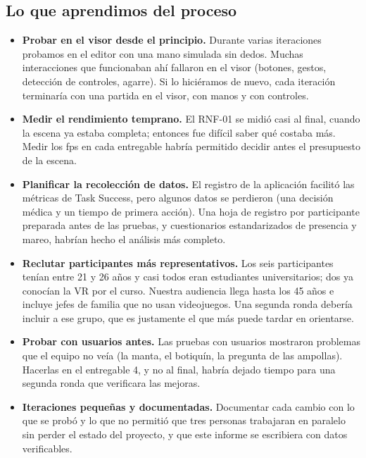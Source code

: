 \documentclass[11pt,a4paper]{article}
\begin{document}
\subsection{Lo que aprendimos del proceso}
\begin{itemize}
    \item \textbf{Probar en el visor desde el principio.} Durante varias iteraciones probamos en el editor con una mano simulada sin dedos. Muchas interacciones que funcionaban ahí fallaron en el visor (botones, gestos, detección de controles, agarre). Si lo hiciéramos de nuevo, cada iteración terminaría con una partida en el visor, con manos y con controles.
    \item \textbf{Medir el rendimiento temprano.} El RNF-01 se midió casi al final, cuando la escena ya estaba completa; entonces fue difícil saber qué costaba más. Medir los fps en cada entregable habría permitido decidir antes el presupuesto de la escena.
    \item \textbf{Planificar la recolección de datos.} El registro de la aplicación facilitó las métricas de Task Success, pero algunos datos se perdieron (una decisión médica y un tiempo de primera acción). Una hoja de registro por participante preparada antes de las pruebas, y cuestionarios estandarizados de presencia y mareo, habrían hecho el análisis más completo.
    \item \textbf{Reclutar participantes más representativos.} Los seis participantes tenían entre 21 y 26 años y casi todos eran estudiantes universitarios; dos ya conocían la VR por el curso. Nuestra audiencia llega hasta los 45 años e incluye jefes de familia que no usan videojuegos. Una segunda ronda debería incluir a ese grupo, que es justamente el que más puede tardar en orientarse.
    \item \textbf{Probar con usuarios antes.} Las pruebas con usuarios mostraron problemas que el equipo no veía (la manta, el botiquín, la pregunta de las ampollas). Hacerlas en el entregable 4, y no al final, habría dejado tiempo para una segunda ronda que verificara las mejoras.
    \item \textbf{Iteraciones pequeñas y documentadas.} Documentar cada cambio con lo que se probó y lo que no permitió que tres personas trabajaran en paralelo sin perder el estado del proyecto, y que este informe se escribiera con datos verificables.
\end{itemize}
\end{document}
